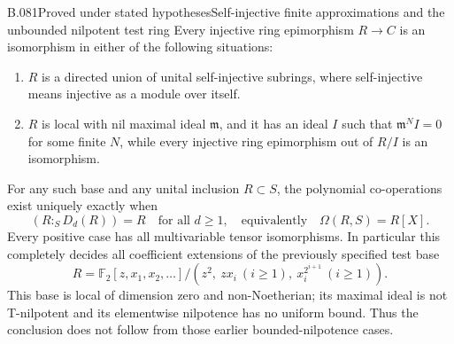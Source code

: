 \begin{saresult}{B.081}{Proved under stated hypotheses}{Self-injective finite approximations and the unbounded nilpotent test ring}
Every injective ring epimorphism $R\to C$ is an isomorphism in either
of the following situations:
\begin{enumerate}
\item $R$ is a directed union of unital self-injective subrings, where
self-injective means injective as a module over itself.
\item $R$ is local with nil maximal ideal $\mathfrak m$, and it has
an ideal $I$ such that $\mathfrak m^N I=0$ for some finite $N$, while
every injective ring epimorphism out of $R/I$ is an isomorphism.
\end{enumerate}
For any such base and any unital inclusion $R\subset S$, the polynomial
co-operations exist uniquely exactly when
\[
 (R:_S D_d(R))=R\quad\text{for all }d\ge1,
 \quad\text{equivalently}\quad \Omega(R,S)=R[X].          \tag{B81.1}
\]
Every positive case has all multivariable tensor isomorphisms.
In particular this completely decides all coefficient extensions of
the previously specified test base
\[
 R=\mathbb F_2[z,x_1,x_2,\ldots]/
       (z^2,\ zx_i\ (i\ge1),\ x_i^{2^{i+1}}\ (i\ge1)).   \tag{B81.2}
\]
This base is local of dimension zero and non-Noetherian; its maximal
ideal is not T-nilpotent and its elementwise nilpotence has no uniform
bound. Thus the conclusion does not follow from those earlier
bounded-nilpotence cases.
\end{saresult}
